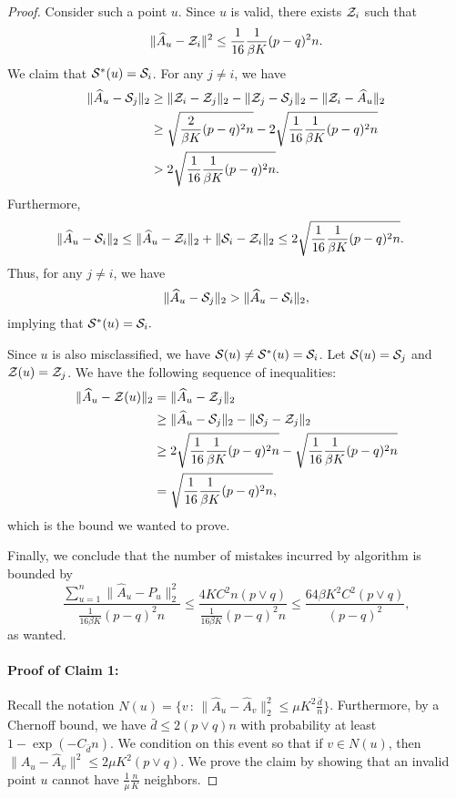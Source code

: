 \documentclass{article}
\begin{document}
\begin{proof}
Consider such a point $u$. Since $u$ is valid, there exists ${\cal Z}_i$ such that
$$ \| \hat A_u - {\cal Z}_i \|^2 \leq \frac{1}{16}\frac{1}{\beta K} (p-q)^2 n.$$
We claim that ${\cal S}^*(u) = {\cal S}_i$. For any $j \neq i$, we have
\begin{align*}
\| \hat A_u - {\cal S}_j \|_2 &\geq \|{\cal Z}_i - {\cal Z}_j \|_2 - \|{\cal Z}_j - {\cal S}_j \|_2 - \|{\cal Z}_i - \hat A_u\|_2 \\
&\geq \sqrt{\frac{2}{\beta K} (p-q)^2 n} - 2\sqrt{\frac{1}{16}\frac{1}{\beta K} (p-q)^2 n}\\
&> 2\sqrt{\frac{1}{16}\frac{1}{\beta K} (p-q)^2 n}.
\end{align*}
Furthermore,
\begin{align*}
\| \hat A_u - {\cal S}_i \|_2 &\leq \| \hat A_u - {\cal Z}_i \|_2 + \| {\cal S}_i - {\cal Z}_i \|_2 \leq 2 \sqrt{\frac{1}{16}\frac{1}{\beta K} (p-q)^2 n}.
\end{align*}
Thus, for any $j \neq i$, we have
\begin{align*}
\| \hat A_u - {\cal S}_j \|_2  > \| \hat A_u - {\cal S}_i \|_2,
\end{align*}
implying that ${\cal S}^*(u) = {\cal S}_i.$

Since $u$ is also misclassified, we have ${\cal S}(u) \neq {\cal S}^*(u) = {\cal S}_i$. Let ${\cal S}(u) = {\cal S}_j$ and ${\cal Z}(u) = {\cal Z}_j$. We have the following sequence of inequalities:
\begin{align*}
\|\hat A_u - {\cal Z}(u)\|_2 &= \| \hat A_u - {\cal Z}_j \|_2 \\
&\geq \| \hat A_u - {\cal S}_j \|_2 - \| {\cal S}_j - {\cal Z}_j \|_2 \\
&\geq 2\sqrt{\frac{1}{16}\frac{1}{\beta K} (p-q)^2 n} - \sqrt{\frac{1}{16}\frac{1}{\beta K} (p-q)^2 n}\\
&= \sqrt{\frac{1}{16}\frac{1}{\beta K} (p-q)^2 n},
\end{align*}
which is the bound we wanted to prove.

Finally, we conclude that the number of mistakes incurred by algorithm is bounded by
\[
\frac{\sum_{u=1}^n \| \hat{A}_u - P_u \|_2^2}{ \frac{1}{16 \beta K} (p-q)^2 n } \leq 
        \frac{ 4 K C^2 n (p \vee q)}{ \frac{1}{16 \beta K} (p-q)^2 n} \leq \frac{64 \beta K^2 C^2 (p \vee q)}{(p-q)^2},
\]
as wanted.

\paragraph{\textbf{Proof of Claim 1:}} Recall the notation $N(u) = \{ v \,:\, \| \hat{A}_u - \hat{A}_v \|_2^2 \leq \mu K^2 \frac{\bar{d}}{n} \}$. Furthermore, by a Chernoff bound, we have $\bar{d} \leq 2 (p \vee q) n$ with probability at least $1 - \exp(-C_{\bar d}n)$. 
We condition on this event so that if $v \in N(u)$, then $\| \hat{A}_u - \hat{A}_v \|^2 \leq 2 \mu K^2 (p \vee q)$. We prove the claim by showing that an invalid point $u$ cannot have $\frac{1}{\mu} \frac{n}{K}$ neighbors.


\end{proof}
\end{document}
